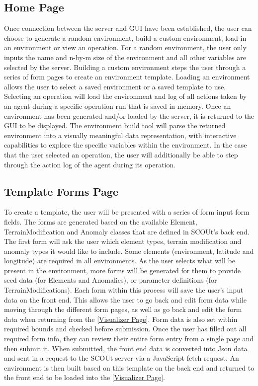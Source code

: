 \subsection{Home Page}
Once connection between the server and GUI have been established, the user can choose to generate a random environment, build a custom environment, load in an environment or view an operation.
For a random environment, the user only inputs the name and n-by-m size of the environment and all other variables are selected by the server.
Building a custom environment steps the user through a series of form pages to create an environment template.
Loading an environment allows the user to select a saved environment or a saved template to use.
Selecting an operation will load the environment and log of all actions taken by an agent during a specific operation run that is saved in memory.
Once an environment has been generated and/or loaded by the server, it is returned to the GUI to be displayed.
The environment build tool will parse the returned environment into a visually meaningful data representation, with interactive capabilities to explore the specific variables within the environment.
In the case that the user selected an operation, the user will additionally be able to step through the action log of the agent during its operation.


\subsection{Template Forms Page}
To create a template, the user will be presented with a series of form input form fields.
The forms are generated based on the available Element, TerrainModification and Anomaly classes that are defined in SCOUt's back end.
The first form will ask the user which element types, terrain modification and anomaly types it would like to include.
Some elements (environment, latitude and longitude) are required in all environments.
As the user selects what will be present in the environment, more forms will be generated for them to provide seed data (for Elements and Anomalies), or parameter definitions (for TerrainModifications).
Each form within this process will save the user’s input data on the front end.
This allows the user to go back and edit form data while moving through the different form pages, as well as go back and edit the form data when returning from the \ref{Visualizer Page}.
Form data is also set within required bounds and checked before submission.
Once the user has filled out all required form info, they can review their entire form entry from a single page and then submit it.
When submitted, the front end data is converted into Json data and sent in a request to the SCOUt server via a JavaScript fetch request.
An environment is then built based on this template on the back end and returned to the front end to be loaded into the \ref{Visualizer Page}.


